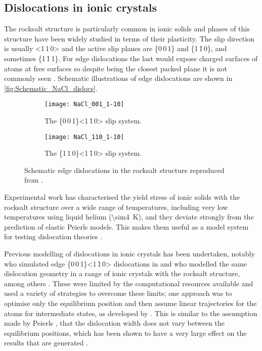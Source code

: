 \subsection{Dislocations in ionic crystals}




The rocksalt structure is particularly common in ionic solids and phases of this structure have been widely studied in terms of their plasticity. The slip direction is usually <1\,1\,0> and the active slip planes are \{0\,0\,1\} and \{1\,\={1}\,0\}, and sometimes \{1\,\={1}\,1\}. For edge dislocations the last would expose charged surfaces of atoms at free surfaces so despite being the closest packed plane it is not commonly seen \cite{Haasen1985}. Schematic illustrations of edge dislocations are shown in \autoref{fig:Schematic_NaCl_dislocs}.

\begin{figure}
\centering
    \begin{subfigure}{0.8\textwidth}
    \centering
    \texttt{[image: NaCl\_001\_1-10]}
    \caption{The \{0\,0\,1\}<1\,\={1}\,0> slip system.\label{fig:NaCl_110_001_core_structure}}
    \end{subfigure}
\par\bigskip
    \begin{subfigure}{0.8\textwidth}
    \centering
    \texttt{[image: NaCl\_110\_1-10]}
    \caption{The \{1\,1\,0\}<1\,\={1}\,0> slip system.\label{fig:NaCl_110_110_core_structure}}
    \end{subfigure}
\caption[Edge dislocations in the rock salt crystals.]{Schematic edge dislocations in the rocksalt structure reproduced from \cite{Haasen1985}. \label{fig:Schematic_NaCl_dislocs}}
\end{figure}





Experimental work has characterised the yield stress of ionic solids with the rocksalt structure over a wide range of temperatures, including very low temperatures using liquid helium (\SI{\sim4}{\kelvin}), and they deviate strongly from the prediction of elastic Peierls models. This makes them useful as a model system for testing dislocation theories \cite{Haasen1985}.

Previous modelling of dislocations in ionic crystals has been undertaken, notably \citet{puls1976} who simulated edge \{0\,0\,1\}<1\,\={1}\,0> dislocations in  and \citet{Woo1977} who modelled the same dislocation geometry in a range of ionic crystals with the rocksalt structure, among others \cite{Granzer1968,Woo1976,Hoagland1976,Brandt1987,Soullard1991,Foitzik1991}. These were limited by the computational resources available and used a variety of strategies to overcome these limits; one approach was to optimise only the equilibrium position and then assume linear trajectories for the atoms for intermediate states, as developed by \citet{Granzer1968}. This is similar to the assumption made by Peierls \cite{Peierls1940}, that the dislocation width does not vary between the equilibrium positions, which has been shown to have a very large effect on the results that are generated \cite{Clegg2006,Bulatov1997}.

